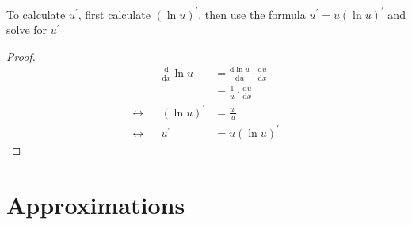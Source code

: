 \begin{enumerate}
        To calculate $u^\prime$, first calculate $(\ln u)^\prime$, then use the formula $u^\prime=u(\ln u)^\prime$ and solve for $u^\prime$
        \begin{proof}
            \begin{align*}
                && \frac{\mathrm{d}}{\mathrm{d}x}\ln u & =\frac{\mathrm{d}\ln u}{\mathrm{d}u}\cdot\frac{\mathrm{d}u}{\mathrm{d}x} \\
                && & =\frac{1}{u}\cdot\frac{\mathrm{d}u}{\mathrm{d}x} \\
                \leftrightarrow && (\ln u)^\prime & =\frac{u^\prime}{u} \\
                \leftrightarrow && u^\prime & =u(\ln u)^\prime
            \end{align*}
        \end{proof}
\end{enumerate}

\chapter{Approximations}
